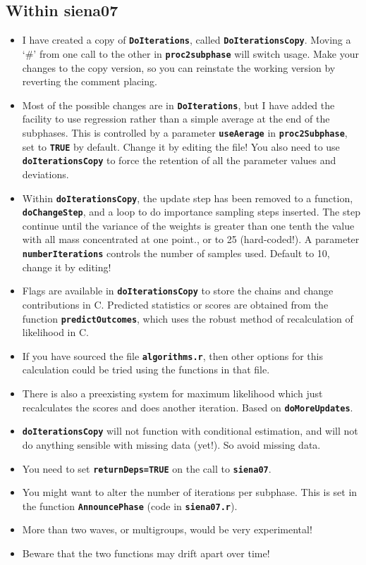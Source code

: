 \documentclass[12pt, a4paper]{article}
\renewcommand{\=}{\,=\,}
\newcommand{\+}{\,+\,}
\newcommand{\sfn}[1]{\textbf{\texttt{#1}}}
\begin{document}
\subsection{Within siena07}
\begin{itemize}
\item I have created a copy of \sfn{DoIterations}, called
  \sfn{DoIterationsCopy}. Moving a `\#' from one call to the other in
  \sfn{proc2subphase} will switch usage. Make your changes to the copy version,
  so you can reinstate the working version by reverting the comment placing.
\item Most of the possible changes are in \sfn{DoIterations}, but I have added
  the facility to use regression rather than a simple average at the end of the
  subphases. This is controlled by a parameter \sfn{useAerage} in
  \sfn{proc2Subphase}, set to \sfn{TRUE} by default. Change it by editing the
  file! You also need to use \sfn{doIterationsCopy} to force the retention of
  all the parameter values and deviations.
\item Within \sfn{doIterationsCopy}, the update step has been removed to a
  function, \sfn{doChangeStep}, and a loop to do importance sampling steps
  inserted. The step continue until the variance of the weights is greater than
  one tenth the value with all mass concentrated at one point., or to 25
  (hard-coded!). A parameter \sfn{numberIterations} controls the number of
  samples used. Default to 10, change it by editing!
\item Flags are available in \sfn{doIterationsCopy} to store the chains and
  change contributions in C. Predicted statistics or scores are obtained from
  the function \sfn{predictOutcomes}, which uses the robust method of
  recalculation of likelihood in C.
\item If you have sourced the file \sfn{algorithms.r}, then other options for
  this calculation could be tried using the functions in that file.
\item There is also a preexisting system for maximum likelihood which just
  recalculates the scores and does another iteration. Based on
  \sfn{doMoreUpdates}.
\item \sfn{doIterationsCopy} will not function with conditional estimation,
and will not do anything sensible with missing data (yet!). So avoid missing
data.
\item You need to set \sfn{returnDeps=TRUE} on the call to \sfn{siena07}.
\item You might want to alter the number of iterations per subphase. This is set
  in the function \sfn{AnnouncePhase} (code in \sfn{siena07.r}).
\item More than two waves, or multigroups, would be very experimental!
\item Beware that the two functions may drift apart over time!
\end{itemize}
\end{document}

